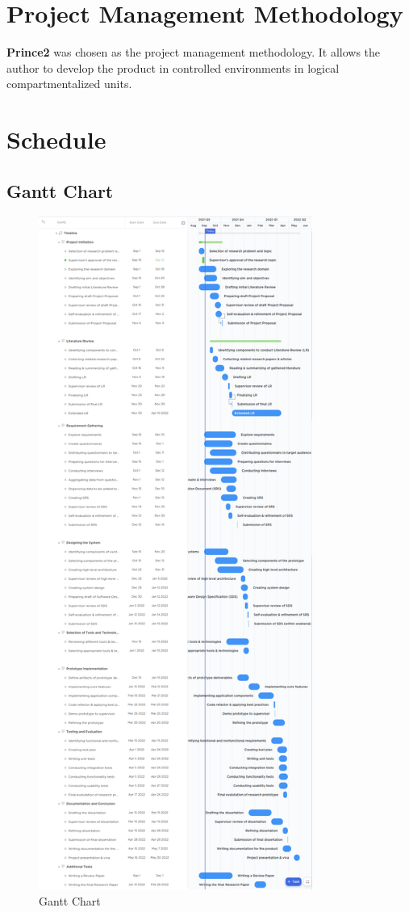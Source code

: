 \documentclass[a4paper, 12pt, oneside]{report}
\begin{document}
\section{Project Management Methodology}
\textbf{Prince2}  was chosen as the project management methodology. It allows the author to develop the product in controlled environments in logical compartmentalized units.
 
\newpage
\section{Schedule}
\subsection{Gantt Chart}
\begin{figure}[h!]
\centering
\includegraphics[width=0.8\textwidth,height=0.8\textheight]{images/gantt-chart.png}
\caption{Gantt Chart}
\end{figure}
\end{document}
